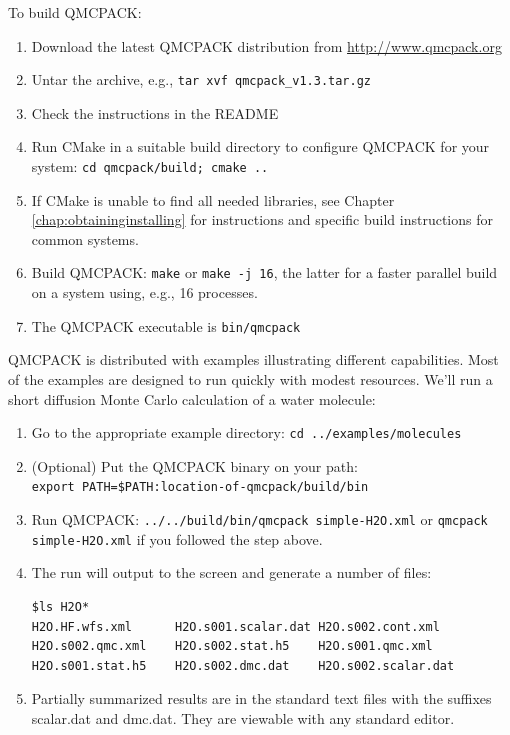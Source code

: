 To build QMCPACK:

\begin{enumerate}
\item Download the latest QMCPACK distribution from
  \url{http://www.qmcpack.org}
\item Untar the archive, e.g., \texttt{tar xvf
    qmcpack\_v1.3.tar.gz}
\item Check the instructions in the README
\item Run CMake in a suitable build directory to configure QMCPACK for
  your system: \texttt{cd
    qmcpack/build; cmake ..}
\item If CMake is unable to find all needed libraries, see Chapter
  \ref{chap:obtaininginstalling} for instructions and specific build
  instructions for common systems.
\item Build QMCPACK: \texttt{make} or \texttt{make -j 16}, the latter
  for a faster parallel build on a system using, e.g., 16 processes.
\item The QMCPACK executable is \texttt{bin/qmcpack}
\end{enumerate}

QMCPACK is distributed with examples illustrating different
capabilities. Most of the examples are designed to run quickly with
modest resources. We'll run a short diffusion Monte Carlo calculation
of a water molecule:

\begin{enumerate}
\item Go to the appropriate example directory: \texttt{cd
    ../examples/molecules}
\item (Optional) Put the QMCPACK binary on your path:\\ \texttt{export PATH=\$PATH:location-of-qmcpack/build/bin}
\item Run QMCPACK: \texttt{../../build/bin/qmcpack simple-H2O.xml} or
  \texttt{qmcpack simple-H2O.xml} if you followed the step above.
\item The run will output to the screen and generate a number of files:
\begin{verbatim}
$ls H2O*
H2O.HF.wfs.xml      H2O.s001.scalar.dat H2O.s002.cont.xml
H2O.s002.qmc.xml    H2O.s002.stat.h5    H2O.s001.qmc.xml
H2O.s001.stat.h5    H2O.s002.dmc.dat    H2O.s002.scalar.dat
\end{verbatim}
\item Partially summarized results are in the standard text files with the
  suffixes scalar.dat and dmc.dat. They are viewable with any standard editor.
\end{enumerate}

